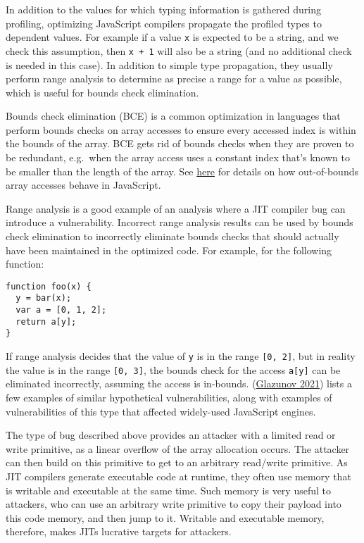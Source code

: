 \documentclass[
  a4paper,
]{report}
\begin{document}
In addition to the values for which typing information is gathered
during profiling, optimizing JavaScript compilers propagate the profiled
types to dependent values. For example if a value \texttt{x} is expected
to be a string, and we check this assumption, then \texttt{x\ +\ 1} will
also be a string (and no additional check is needed in this case). In
addition to simple type propagation, they usually perform range
analysis to determine as precise a range for a
value as possible, which is useful for bounds check
elimination.

Bounds check elimination (BCE) is a
common optimization in languages that perform bounds checks on array
accesses to ensure every accessed index is within the bounds of the
array. BCE gets rid of bounds checks when they are proven to be
redundant, e.g.~when the array access uses a constant index that's known
to be smaller than the length of the array. See
\href{https://developer.mozilla.org/en-US/docs/Web/JavaScript/Reference/Global_Objects/Array/length}{here}
for details on how out-of-bounds array accesses behave in JavaScript.

Range analysis is a good example of an analysis where a JIT compiler bug
can introduce a vulnerability. Incorrect range analysis results can be
used by bounds check elimination to incorrectly eliminate bounds checks
that should actually have been maintained in the optimized code. For
example, for the following function:

\begin{verbatim}
function foo(x) {
  y = bar(x);
  var a = [0, 1, 2];
  return a[y];
}
\end{verbatim}

If range analysis decides that the value of \texttt{y} is in the range
\texttt{{[}0,\ 2{]}}, but in reality the value is in the range
\texttt{{[}0,\ 3{]}}, the bounds check for the access \texttt{a{[}y{]}}
can be eliminated incorrectly, assuming the access is in-bounds.
(\protect\hyperlink{ref-Glazunov2021}{Glazunov 2021}) lists a few
examples of similar hypothetical vulnerabilities, along with examples of
vulnerabilities of this type that affected widely-used JavaScript
engines.

The type of bug described above provides an attacker with a limited read
or write primitive, as a linear overflow of the array allocation occurs.
The attacker can then build on this primitive to get to an arbitrary
read/write primitive. As JIT compilers generate executable code at
runtime, they often use memory that is writable and executable at the
same time. Such memory is very useful to attackers, who can use an
arbitrary write primitive to copy their payload into this code memory,
and then jump to it. Writable and executable memory, therefore, makes
JITs lucrative targets for attackers.
\end{document}
